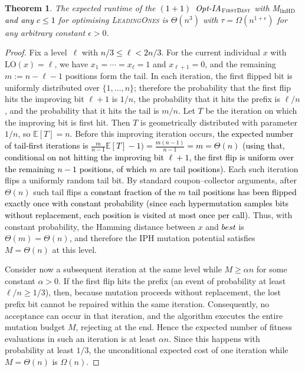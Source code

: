 \documentclass[lettersize,journal]{IEEEtran}
\newcommand{\new}[1]{\textcolor{black}{#1}}
\newcommand{\rerev}[1]{\textcolor{black}{#1}}
\newcommand{\EE}{\mathbb{E}}
\newcommand{\linHD}{M$_{\text{linHD}}$}
\newtheorem{theorem}{Theorem}
\begin{document}
\setcounter{theorem}{7}
\begin{theorem}\label{thm:FBleadingones}
The expected runtime of the \new{$(1+1)$~Opt-IA$_{\textsc{FirstBest}}$}  with {\linHD } \new{and any $c\leq 1$} for optimising
\textsc{LeadingOnes} is $\Theta(n^3)$ with $\tau=\Omega(n^{1+\epsilon})$ for any arbitrary
constant $\epsilon>0$.
\end{theorem}
\begin{proof}

Fix a level~$\ell$ with \rerev{$n/3 \le \ell < 2n/3$}. For the current individual $x$ with $\mathrm{LO}(x)=\ell$, we have $x_1=\cdots=x_{\ell}=1$ and $x_{\ell+1}=0$, and the remaining $m:=n-\ell-1$ positions form the tail. In each iteration, the first flipped bit is uniformly distributed over $\{1,\dots,n\}$; therefore the probability that the first flip hits the improving bit $\ell+1$ is $1/n$, the probability that it hits the prefix is $\ell/n$, and the probability that it hits the tail is $m/n$. Let $T$ be the iteration on which the improving bit is first hit. Then $T$ is geometrically distributed with parameter~$1/n$, so $\EE[T]=n$. Before this improving iteration occurs, \textcolor{black}{the expected number of tail-first iterations is
$\frac{m}{n-1}\EE[T]-1) = \frac{m(n-1)}{n-1} = m = \Theta(n)$
(using that, conditional on not hitting the improving bit $\ell+1$, the
first flip is uniform over the remaining $n-1$ positions, of which $m$
are tail positions).} Each such iteration flips a uniformly random tail bit. By standard coupon--collector arguments, after $\Theta(n)$ such tail flips \textcolor{black}{a constant fraction of the $m$ tail positions has been flipped exactly once
with constant probability (since each hypermutation samples bits without
replacement, each position is visited at most once per call).} Thus, with constant probability, the Hamming distance between $x$ and \textcolor{black}{$\mathit{best}$} is $\Theta(m)=\Theta(n)$, and therefore the IPH mutation potential satisfies $M=\Theta(n)$ at this level.

Consider now a subsequent iteration at the same level while $M\ge \alpha n$ for some constant $\alpha>0$. If the first flip hits the prefix (an event of probability at least $\ell/n\ge 1/3$), then, because mutation proceeds without replacement, the lost prefix bit cannot be repaired within the same iteration. Consequently, no acceptance can occur in that iteration, and the algorithm executes the entire mutation budget $M$, rejecting at the end. Hence the expected number of fitness evaluations in such an iteration is at least $\alpha n$. Since this happens with probability at least $1/3$, the unconditional expected cost of one iteration while $M=\Theta(n)$ is $\Omega(n)$.


\end{proof}
\end{document}
